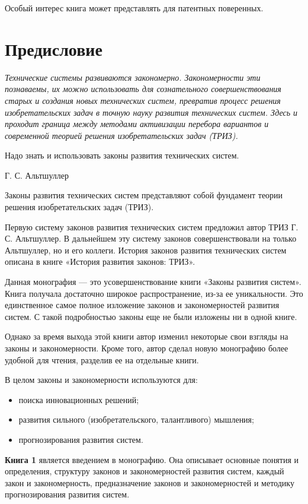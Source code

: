 \documentclass[11pt,a4paper]{article}
\begin{document}
Особый интерес книга может представлять для патентных поверенных.

\section*{Предисловие}

\begin{flushright}
  \begin{minipage}{.8\textwidth}\it
    Технические системы развиваются закономерно. Закономерности эти познаваемы,
    их можно использовать для сознательного совершенствования старых и создания
    новых технических систем, превратив процесс решения изобретательских задач в
    точную науку развития технических систем. Здесь и проходит граница между
    методами активизации перебора вариантов и современной теорией решения
    изобретательских задач (ТРИЗ). 

    Надо знать и использовать законы развития технических систем.
    \begin{flushright}
      Г. С. Альтшуллер
    \end{flushright}
  \end{minipage}
\end{flushright}
Законы развития технических систем представляют собой фундамент теории решения
изобретательских задач (ТРИЗ).

Первую систему законов развития технических систем предложил автор ТРИЗ
Г. С. Альтшуллер. В дальнейшем эту систему законов совершенствовали на только
Альтшуллер, но и его коллеги. История законов развития технических систем
описана в книге «История развития законов: ТРИЗ».

Данная монография — это усовершенствование книги «Законы развития систем».
Книга получала достаточно широкое распространение, из-за ее уникальности. Это
единственное самое полное изложение законов и закономерностей развития
систем. С такой подробностью законы еще не были изложены ни в одной книге.

Однако за время выхода этой книги автор изменил некоторые свои взгляды на
законы и закономерности. Кроме того, автор сделал новую монографию более
удобной для чтения, разделив ее на отдельные книги.

В целом законы и закономерности используются для:
\begin{itemize}[noitemsep]
  \item поиска инновационных решений;
  \item развития сильного (изобретательского, талантливого) мышления;
  \item прогнозирования развития систем.
\end{itemize}
\textbf{Книга 1} является введением в монографию. Она описывает основные
понятия и определения, структуру законов и закономерностей развития систем,
каждый закон и закономерность, предназначение законов и закономерностей и
методику прогнозирования развития систем.
\end{document}
